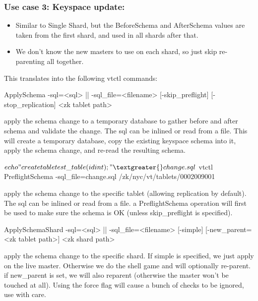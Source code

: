 \subsubsection{Use case 3: Keyspace update:}\hypertarget{use-case-3-keyspace-update}{}\label{use-case-3-keyspace-update}

\begin{itemize}
\item Similar to Single Shard, but the BeforeSchema and AfterSchema values are taken from the first shard, and used in all shards after that.
\item We don't know the new masters to use on each shard, so just skip re-parenting all together.
\end{itemize}

This translates into the following vtctl commands:

\begin{codesample2}
  ApplySchema {-sql=<sql> || -sql_file=<filename>} 
              [-skip_preflight] [-stop_replication] <zk tablet path> 
\end{codesample2}

apply the schema change to a temporary database to gather before and after schema and validate the change. The sql can be inlined or read from a file.
This will create a temporary database, copy the existing keyspace schema into it, apply the schema change, and re-read the resulting schema.


\begin{codesample2}
$ echo "create table test\_table(id int);" \textgreater{} change.sql
$ vtctl PreflightSchema -sql\_file=change.sql /zk/nyc/vt/tablets/0002009001
\end{codesample2}

apply the schema change to the specific tablet (allowing replication by default). 
The sql can be inlined or read from a file.
a PreflightSchema operation will first be used to make sure the schema is OK (unless skip\_preflight is specified).

\begin{codesample2}
  ApplySchemaShard {-sql=<sql> ||   -sql_file=<filename>} 
     [-simple] [-new_parent=<zk tablet path>] <zk shard path>
\end{codesample2}

apply the schema change to the specific shard. If simple is specified, we just apply on the live master. Otherwise we do the shell game and will optionally re-parent. 
if new\_parent is set, we will also reparent (otherwise the master won't be touched at all). Using the force flag will cause a bunch of checks to be ignored, use with care.

